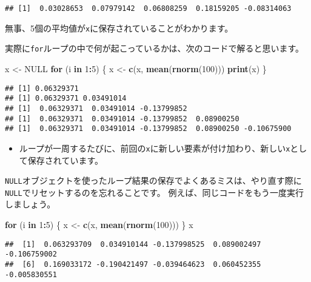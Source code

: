 \documentclass[]{bxjsarticle}
\newenvironment{Shaded}{\begin{snugshade}}{\end{snugshade}}
\newcommand{\ControlFlowTok}[1]{\textcolor[rgb]{0.13,0.29,0.53}{\textbf{#1}}}
\newcommand{\DecValTok}[1]{\textcolor[rgb]{0.00,0.00,0.81}{#1}}
\newcommand{\KeywordTok}[1]{\textcolor[rgb]{0.13,0.29,0.53}{\textbf{#1}}}
\newcommand{\NormalTok}[1]{#1}
\newcommand{\OperatorTok}[1]{\textcolor[rgb]{0.81,0.36,0.00}{\textbf{#1}}}
\newcommand{\OtherTok}[1]{\textcolor[rgb]{0.56,0.35,0.01}{#1}}
\newcommand{\StringTok}[1]{\textcolor[rgb]{0.31,0.60,0.02}{#1}}
\providecommand{\tightlist}{%
  \setlength{\itemsep}{0pt}\setlength{\parskip}{0pt}}
\begin{document}
\begin{verbatim}
## [1]  0.03028653  0.07979142  0.06808259  0.18159205 -0.08314063
\end{verbatim}

無事、5個の平均値が\texttt{x}に保存されていることがわかります。

実際に\texttt{for}ループの中で何が起こっているかは、次のコードで解ると思います。

\begin{Shaded}
\begin{Highlighting}[]
\NormalTok{x <-}\StringTok{ }\OtherTok{NULL}
\ControlFlowTok{for}\NormalTok{ (i }\ControlFlowTok{in} \DecValTok{1}\OperatorTok{:}\DecValTok{5}\NormalTok{) \{}
\NormalTok{  x <-}\StringTok{ }\KeywordTok{c}\NormalTok{(x, }\KeywordTok{mean}\NormalTok{(}\KeywordTok{rnorm}\NormalTok{(}\DecValTok{100}\NormalTok{)))}
  \KeywordTok{print}\NormalTok{(x)}
\NormalTok{\}}
\end{Highlighting}
\end{Shaded}

\begin{verbatim}
## [1] 0.06329371
## [1] 0.06329371 0.03491014
## [1]  0.06329371  0.03491014 -0.13799852
## [1]  0.06329371  0.03491014 -0.13799852  0.08900250
## [1]  0.06329371  0.03491014 -0.13799852  0.08900250 -0.10675900
\end{verbatim}

\begin{itemize}
\tightlist
\item
  ループが一周するたびに、前回の\texttt{x}に新しい要素が付け加わり、新しい\texttt{x}として保存されています。
\end{itemize}

\texttt{NULL}オブジェクトを使ったループ結果の保存でよくあるミスは、やり直す際に\texttt{NULL}でリセットするのを忘れることです。
例えば、同じコードをもう一度実行しましょう。

\begin{Shaded}
\begin{Highlighting}[]
\ControlFlowTok{for}\NormalTok{ (i }\ControlFlowTok{in} \DecValTok{1}\OperatorTok{:}\DecValTok{5}\NormalTok{) \{}
\NormalTok{  x <-}\StringTok{ }\KeywordTok{c}\NormalTok{(x, }\KeywordTok{mean}\NormalTok{(}\KeywordTok{rnorm}\NormalTok{(}\DecValTok{100}\NormalTok{)))}
\NormalTok{\}}
\NormalTok{x}
\end{Highlighting}
\end{Shaded}

\begin{verbatim}
##  [1]  0.063293709  0.034910144 -0.137998525  0.089002497 -0.106759002
##  [6]  0.169033172 -0.190421497 -0.039464623  0.060452355 -0.005830551
\end{verbatim}
\end{document}

